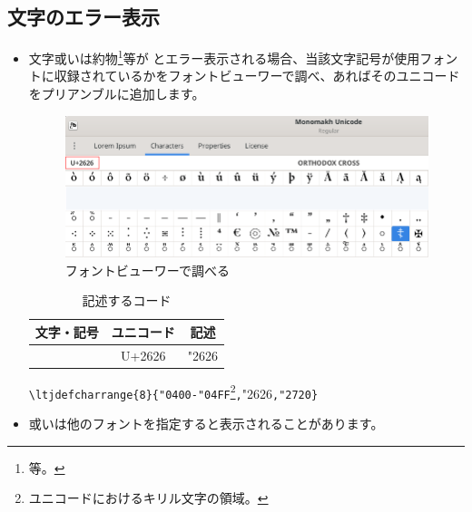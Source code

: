 \documentclass[a4paper,12pt]{ltjsarticle}
\def\colH#1{\color[HTML]{#1}}
\def\bf{\textbf}
\begin{document}
\subsection{文字のエラー表示}
\vspace{-4mm}

\begin{itemize}
  \item 文字或いは約物\footnote{等。}等が  とエラー表示される場合、当該文字記号が使用フォントに収録されているかをフォントビューワーで調べ、あればそのユニコードをプリアンブルに追加します。\\
\vspace{-8mm}  
\begin{figure}[H]
\centering
\includegraphics[width=14cm]{./images/sample-symbol.png}  
\caption{フォントビューワーで調べる} 
\end{figure}
\vspace{-10mm}  

\begin{table}[h]
\begin{center}
\begin{tabular}{c|c|c}
\bf{文字・記号} & \bf{ユニコード} & \bf{記述}\\
\hline
\Shafarik{☦} & U+2626 & {\colH{800000}"2626}\\
\end{tabular}
\caption{記述するコード}
\end{center}
\end{table}
\vspace{-6mm}  

  \verb+\ltjdefcharrange{8}{"0400-"04FF+\footnote{ユニコードにおけるキリル文字の領域。}\verb+,+{\fRMono\colH{800000}"2626}\verb+,"2720}+
  \item 或いは他のフォントを指定すると表示されることがあります。
\end{itemize}
\end{document}
